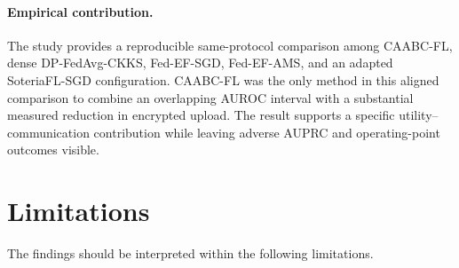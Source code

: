\paragraph{Empirical contribution.}
The study provides a reproducible same-protocol comparison among CAABC-FL, dense DP-FedAvg-CKKS, Fed-EF-SGD, Fed-EF-AMS, and an adapted SoteriaFL-SGD configuration. CAABC-FL was the only method in this aligned comparison to combine an overlapping AUROC interval with a substantial measured reduction in encrypted upload. The result supports a specific utility--communication contribution while leaving adverse AUPRC and operating-point outcomes visible.

\section{Limitations}
\label{sec:conclusion-limitations}

The findings should be interpreted within the following limitations.

